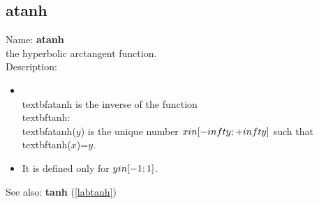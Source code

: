 \subsection{atanh}
\label{labatanh}
\noindent Name: \textbf{atanh}\\
the hyperbolic arctangent function.\\
\noindent Description: \begin{itemize}

\item \\textbf{atanh} is the inverse of the function \\textbf{tanh}: \\textbf{atanh}($y$) is the unique number \n   $x \\in [-\\infty; +\\infty]$ such that \\textbf{tanh}($x$)=$y$.\n
\item It is defined only for $y \\in [-1; 1]$.\n\end{itemize}
See also: \textbf{tanh} (\ref{labtanh})
